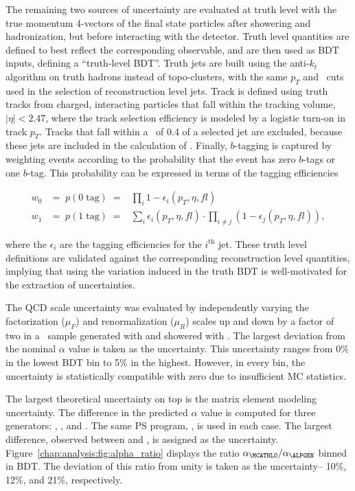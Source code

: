 The remaining two sources of uncertainty are evaluated at truth
level with the true momentum 4-vectors of the final state particles
after showering and hadronization, but before interacting with the
detector. Truth level quantities are defined to best reflect the
corresponding observable, and are then used as BDT inputs, defining a
``truth-level BDT''. Truth jets are built using the anti-$k_t$
algorithm on truth hadrons instead of topo-clusters, with the same
$p_T$ and \eta~cuts used in the selection of reconstruction level jets. Track \etmiss is
defined using truth tracks from charged, interacting particles that
fall within the tracking volume, $|\eta|<2.47$, where the track selection
efficiency is modeled by a logistic turn-on in track $p_T$. Tracks
that fall within a \dR~of 0.4 of a selected jet are excluded, because
these jets are included in the calculation of \etmiss. Finally,
$b$-tagging is captured by weighting events according to the
probability that the event has zero $b$-tags or one $b$-tag. This
probability can be expressed in terms of the tagging efficiencies

\begin{eqnarray}
        w_{0} &=\; p(0\; \textrm{tag})\; =& \prod_{i} 1
        - \epsilon_{i}(p_T,\eta,fl)  \\
        w_{1} &=\; p(1\; \textrm{tag})\;
        =& \sum_{i} \epsilon_{i}(p_T,\eta,fl) \cdot \prod_{i \neq j}
        (1 - \epsilon_{j}(p_T,\eta,fl)),
\label{chap:analysis:eq:btag_formula}
\end{eqnarray}

\noindent where the $\epsilon_i$ are the tagging efficiencies for the
$i^{\textrm{th}}$ jet. These truth level definitions are validated
against the corresponding reconstruction level quantities, implying
that using the variation induced in the truth BDT is well-motivated for
the extraction of uncertainties. 

The QCD scale uncertainty was evaluated by independently varying the factorization
($\mu_F$) and renormalization ($\mu_R$) scales up and down by a factor
of two in a \ttbar~sample generated with \MCATNLO and showered
with \HERWIG. The largest deviation from the nominal $\alpha$ value is
taken as the uncertainty. This uncertainty ranges from 0\% in the
lowest BDT bin to 5\% in the highest. However, in every bin, the
uncertainty is statistically compatible with zero due to insufficient
MC statistics. 

The largest theoretical uncertainty on top is the matrix element
modeling uncertainty. The difference in the predicted $\alpha$ value
is computed for three generators: \MCATNLO, \POWHEG, and \ALPGEN. The
same PS program, \HERWIG, is used in each case. The largest difference,
observed between \MCATNLO and \ALPGEN, is assigned as the
uncertainty. Figure~\ref{chap:analysis:fig:alpha_ratio} displays the
ratio $\alpha_{\MCATNLO}/\alpha_{\ALPGEN}$ binned in BDT. The deviation
of this ratio from unity is taken as the uncertainty-- 10\%, 12\%, and
21\%, respectively. 

